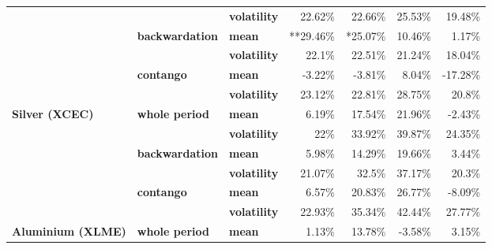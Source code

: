 \documentclass[
  authoryear,
  preprint,
  3p]{elsarticle}
\begin{document}
\begin{longtable}[t]{>{}l>{}l>{}l>{}r>{}r>{}r>{}r}
\textbf{} & \textbf{} & \textbf{volatility} & \textcolor[HTML]{4285f4}{22.62\%} & \textcolor[HTML]{4285f4}{22.66\%} & \textcolor[HTML]{4285f4}{25.53\%} & \textcolor[HTML]{4285f4}{19.48\%}\\
\textbf{} & \textbf{backwardation} & \textbf{mean} & \textcolor[HTML]{4285f4}{**29.46\%} & \textcolor[HTML]{4285f4}{*25.07\%} & \textcolor[HTML]{4285f4}{10.46\%} & \textcolor[HTML]{4285f4}{1.17\%}\\
\addlinespace
\textbf{} & \textbf{} & \textbf{volatility} & \textcolor[HTML]{4285f4}{22.1\%} & \textcolor[HTML]{4285f4}{22.51\%} & \textcolor[HTML]{4285f4}{21.24\%} & \textcolor[HTML]{4285f4}{18.04\%}\\
\textbf{} & \textbf{contango} & \textbf{mean} & \textcolor[HTML]{4285f4}{-3.22\%} & \textcolor[HTML]{4285f4}{-3.81\%} & \textcolor[HTML]{4285f4}{8.04\%} & \textcolor[HTML]{4285f4}{-17.28\%}\\
\textbf{} & \textbf{} & \textbf{volatility} & \textcolor[HTML]{4285f4}{23.12\%} & \textcolor[HTML]{4285f4}{22.81\%} & \textcolor[HTML]{4285f4}{28.75\%} & \textcolor[HTML]{4285f4}{20.8\%}\\
\textbf{Silver (XCEC)} & \textbf{whole period} & \textbf{mean} & \textcolor[HTML]{4285f4}{6.19\%} & \textcolor[HTML]{4285f4}{17.54\%} & \textcolor[HTML]{4285f4}{21.96\%} & \textcolor[HTML]{4285f4}{-2.43\%}\\
\textbf{} & \textbf{} & \textbf{volatility} & \textcolor[HTML]{4285f4}{22\%} & \textcolor[HTML]{4285f4}{33.92\%} & \textcolor[HTML]{4285f4}{39.87\%} & \textcolor[HTML]{4285f4}{24.35\%}\\
\addlinespace
\textbf{} & \textbf{backwardation} & \textbf{mean} & \textcolor[HTML]{4285f4}{5.98\%} & \textcolor[HTML]{4285f4}{14.29\%} & \textcolor[HTML]{4285f4}{19.66\%} & \textcolor[HTML]{4285f4}{3.44\%}\\
\textbf{} & \textbf{} & \textbf{volatility} & \textcolor[HTML]{4285f4}{21.07\%} & \textcolor[HTML]{4285f4}{32.5\%} & \textcolor[HTML]{4285f4}{37.17\%} & \textcolor[HTML]{4285f4}{20.3\%}\\
\textbf{} & \textbf{contango} & \textbf{mean} & \textcolor[HTML]{4285f4}{6.57\%} & \textcolor[HTML]{4285f4}{20.83\%} & \textcolor[HTML]{4285f4}{26.77\%} & \textcolor[HTML]{4285f4}{-8.09\%}\\
\textbf{} & \textbf{} & \textbf{volatility} & \textcolor[HTML]{4285f4}{22.93\%} & \textcolor[HTML]{4285f4}{35.34\%} & \textcolor[HTML]{4285f4}{42.44\%} & \textcolor[HTML]{4285f4}{27.77\%}\\
\textbf{Aluminium (XLME)} & \textbf{whole period} & \textbf{mean} & \textcolor[HTML]{4285f4}{1.13\%} & \textcolor[HTML]{4285f4}{13.78\%} & \textcolor[HTML]{4285f4}{-3.58\%} & \textcolor[HTML]{4285f4}{3.15\%}\\

\end{longtable}
\end{document}
